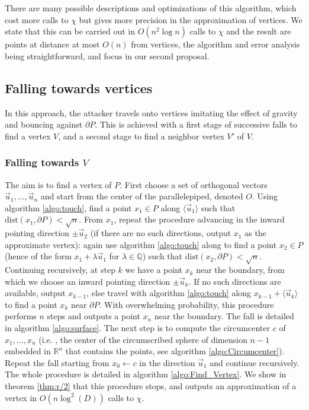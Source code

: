 \documentclass[11pt]{article}
\theoremstyle{plain}
\theoremstyle{definition}
\theoremstyle{remark}
\newcommand{\RR}{\mathbb{R}}      %
\newcommand{\QQ}{\mathbb{Q}}      %
\newcommand{\ie}{i.e.$\!$ }
\newcommand{\bra}{\langle}
\newcommand{\ket}{\rangle}
\newcommand{\dist}{\mbox{dist}}
\begin{document}
There are many possible descriptions and optimizations of this algorithm, which cost more calls to $\chi$ but gives more precision in the approximation of vertices. We state that this can be carried out in $O(n^2\log n)$ calls to $\chi$ and the result are points at distance at most $O(n)$ from vertices, the algorithm and error analysis being straightforward, and focus in our second proposal.

\subsection{Falling towards vertices}

In this approach, the attacker travels onto vertices imitating the effect of gravity and bouncing against $\partial P$. This is achieved with a first stage of successive falls to find a vertex $V$, and a second stage to find a neighbor vertex $V'$ of $V$. 

\subsubsection{Falling towards $V$}
The aim is to find a vertex of $P$. First choose a set of orthogonal vectors $\vec u_1,\dots,\vec u_{n}$ and start from the center of the parallelepiped, denoted $O$. Using algorithm \ref{algo:touch}, find a point $x_1\in P$ along $\bra \vec u_1\ket$ such that $\dist(x_1,\partial P)< \sqrt{n}$. From $x_1$, repeat the procedure advancing in the inward pointing direction $\pm \vec u_2$ (if there are no such directions, output $x_1$ as the approximate vertex): again use algorithm \ref{algo:touch} along to find a point $x_2\in P$ (hence of the form $x_1+\lambda \vec u_1$ for $\lambda\in \QQ$) such that $\dist(x_2,\partial P)< \sqrt{n}$. Continuing recursively, at step $k$ we have a point $x_k$ near the boundary, from which we choose an inward pointing direction $\pm\vec u_k$. If no such directions are available, output $x_{k-1}$, else travel with algorithm \ref{algo:touch} along $x_{k-1}+\bra\vec u_k\ket$ to find a point $x_k$ near $\partial P$. 
With overwhelming probability, this procedure performs $n$ steps and outputs a point $x_n$ near the boundary. The fall is detailed in algorithm \ref{algo:surface}. The next step is to compute the circumcenter $c$ of $x_1,\dots,x_n$ (\ie, the center of the circumscribed sphere of dimension $n-1$ embedded in $\RR^n$ that contains the points, see algorithm \ref{algo:Circumcenter}). Repeat the fall starting from $x_0\leftarrow c$ in the direction $\vec u_1$ and continue recursively. The whole procedure is detailed in algorithm \ref{algo:Find_Vertex}. We show in theorem \ref{thm:r/2} that this procedure stops, and outputs an approximation of a vertex in  $O(n\log^2(D))$ calls to $\chi$.
\end{document}
